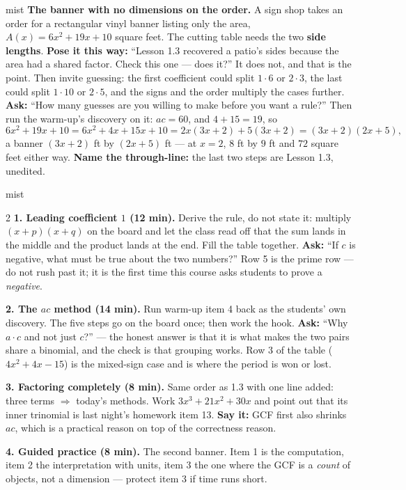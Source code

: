 \documentclass[10pt]{article}
\begin{document}
\begin{skillbox}[Hook]{mist}
\textbf{The banner with no dimensions on the order.} A sign shop takes an order for a rectangular
vinyl banner listing only the area, $A(x)=6x^2+19x+10$ square feet. The cutting table needs the two
\textbf{side lengths}. \textbf{Pose it this way:} ``Lesson 1.3 recovered a patio's sides because the
area had a shared factor. Check this one --- does it?'' It does not, and that is the point. Then
invite guessing: the first coefficient could split $1 \cdot 6$ or $2 \cdot 3$, the last could split
$1 \cdot 10$ or $2 \cdot 5$, and the signs and the order multiply the cases further. \textbf{Ask:}
``How many guesses are you willing to make before you want a rule?'' Then run the warm-up's
discovery on it: $ac = 60$, and $4+15=19$, so
\[ 6x^2+19x+10 = 6x^2+4x+15x+10 = 2x(3x+2)+5(3x+2) = (3x+2)(2x+5), \]
a banner $(3x+2)$ ft by $(2x+5)$ ft --- at $x=2$, $8$ ft by $9$ ft and $72$ square feet either way.
\textbf{Name the through-line:} the last two steps are Lesson 1.3, unedited.
\end{skillbox}

\boxguard
\begin{skillbox}[Lesson]{mist}
\begin{multicols}{2}
\textbf{1. Leading coefficient $1$ (12 min).} Derive the rule, do not state it: multiply
$(x+p)(x+q)$ on the board and let the class read off that the sum lands in the middle and the
product lands at the end. Fill the table together. \textbf{Ask:} ``If $c$ is negative, what must be
true about the two numbers?'' Row 5 is the prime row --- do not rush past it; it is the first time
this course asks students to prove a \emph{negative}.

\textbf{2. The $ac$ method (14 min).} Run warm-up item 4 back as the students' own discovery. The
five steps go on the board once; then work the hook. \textbf{Ask:} ``Why $a \cdot c$ and not just
$c$?'' --- the honest answer is that it is what makes the two pairs share a binomial, and the check
is that grouping works. Row 3 of the table ($4x^2+4x-15$) is the mixed-sign case and is where the
period is won or lost.

\textbf{3. Factoring completely (8 min).} Same order as 1.3 with one line added: three terms
$\Rightarrow$ today's methods. Work $3x^3+21x^2+30x$ and point out that its inner trinomial is last
night's homework item 13. \textbf{Say it:} GCF first also shrinks $ac$, which is a practical reason
on top of the correctness reason.

\textbf{4. Guided practice (8 min).} The second banner. Item 1 is the computation, item 2 the
interpretation with units, item 3 the one where the GCF is a \emph{count} of objects, not a
dimension --- protect item 3 if time runs short.
\end{multicols}
\end{skillbox}
\end{document}
